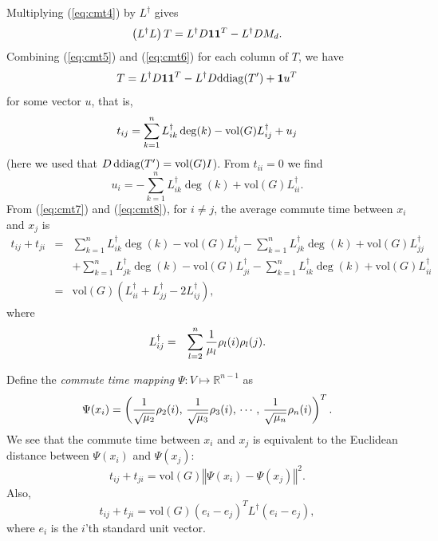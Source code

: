 Multiplying (\ref{eq:cmt4}) by $L^\dagger$ gives
\begin{equation}
\left(L^\dagger L\right)T=L^\dagger D\mathbf{1}\mathbf{1}^T -L^\dagger DM_{d}.\label{eq:cmt6}
\end{equation}
Combining (\ref{eq:cmt5}) and (\ref{eq:cmt6}) for each column of $T$, we have
\begin{equation}
T=L^\dagger D\mathbf{1}\mathbf{1}^T-L^\dagger D\mathrm{ddiag}(T')+{\textbf 1}{ u}^{T}
\end{equation}
for some vector $u$, that is,
\begin{equation}
t_{ij}=\sum_{k=1}^{n}L_{ik}^\dagger \deg(k)-\operatorname{vol}(G)L_{ij}^\dagger +u_{j}\label{eq:cmt7}
\end{equation}
(here we used that $D\,\mathrm{ddiag}(T')= \operatorname{vol}(G) I$).
From $t_{ii}=0$ we find
\begin{equation}
u_{i}=-\sum_{k=1}^{n}L_{ik}^\dagger \deg(k)+\text{vol}(G)L_{ii}^\dagger .\label{eq:cmt8}
\end{equation}
From (\ref{eq:cmt7}) and (\ref{eq:cmt8}), for $i\neq j$, the average
commute time between ${x}_{i}$ and ${x}_{j}$ is
\begin{eqnarray}
t_{ij}+t_{ji} & = & \sum_{k=1}^{n}L_{ik}^\dagger \deg(k)-\text{vol}(G)L_{ij}^\dagger -\sum_{k=1}^{n}L_{jk}^\dagger \deg(k)+\text{vol}(G)L_{jj}^\dagger \nonumber \\
 &  & +\sum_{k=1}^{n}L_{jk}^\dagger \deg(k)-\text{vol}(G)L_{ji}^\dagger -\sum_{k=1}^{n}L_{ik}^\dagger \deg(k)+\text{vol}(G)L_{ii}^\dagger \nonumber \\
 & = & \text{vol}(G)\left(L_{ii}^\dagger +L_{jj}^\dagger -2L_{ij}^\dagger \right),\label{eq:cmt9}
\end{eqnarray}
where
\begin{eqnarray}
L_{ij}^\dagger  & = & \sum_{l=2}^{n}\frac{1}{\mu_{l}}{\rho}_{l}(i){\rho}_{l}(j).\label{eq:cmt10}
\end{eqnarray}

Define the {\em commute time mapping} $\Psi : V \mapsto \mathbb{R}^{n-1}$ as
\begin{equation}
\Psi(x_{i}) = \left(\frac{1}{\sqrt{\mu_{2}}}{\rho}_{2}(i),\,\frac{1}{\sqrt{\mu_{3}}}{\rho}_{3}(i),\,\cdots,\,\frac{1}{\sqrt{\mu_{n}}}{\rho}_{n}(i)\right)^{T}.\label{eq:commute_time_embedding}\end{equation}
We see that the commute time between $x_i$ and $x_j$ is equivalent to the Euclidean distance between $\Psi(x_i)$ and $\Psi(x_j)$:
\begin{equation}
t_{ij}+t_{ji}=\text{vol}(G)\left\Vert \Psi({x}_{i})-\Psi({x}_{j})\right\Vert ^{2}.
\end{equation}
Also,
\begin{equation}
t_{ij}+t_{ji}=\text{vol}(G) (e_i - e_j)^T L^\dagger (e_i - e_j),
\end{equation}
where $e_i$ is the $i$'th standard unit vector.

